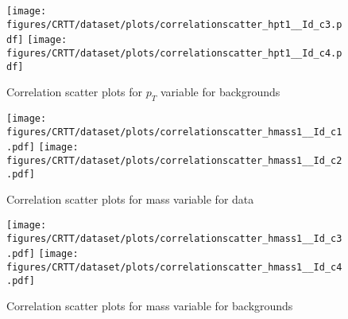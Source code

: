 \begin{figure}[!htb]%
\centering
\texttt{[image: figures/CRTT/dataset/plots/correlationscatter\_hpt1\_\_Id\_c3.pdf]}
\texttt{[image: figures/CRTT/dataset/plots/correlationscatter\_hpt1\_\_Id\_c4.pdf]}
\caption{ Correlation scatter plots for \HBB $p_{T}$ variable for backgrounds}%
\label{fig:correlations_CRTT_hpt1_BG}                                                       
\end{figure}\clearpage



\begin{figure}[!htb]%
\centering
\texttt{[image: figures/CRTT/dataset/plots/correlationscatter\_hmass1\_\_Id\_c1.pdf]}
\texttt{[image: figures/CRTT/dataset/plots/correlationscatter\_hmass1\_\_Id\_c2.pdf]}
\caption{ Correlation scatter plots for \HBB mass  variable for data}%
\label{fig:correlations_CRTT_hmass1_S}                                                       
\end{figure}\clearpage


\begin{figure}[!htb]%
\centering
\texttt{[image: figures/CRTT/dataset/plots/correlationscatter\_hmass1\_\_Id\_c3.pdf]}
\texttt{[image: figures/CRTT/dataset/plots/correlationscatter\_hmass1\_\_Id\_c4.pdf]}
\caption{ Correlation scatter plots for \HBB mass variable for backgrounds}%
\label{fig:correlations_CRTT_hmass1_BG}                                                       
\end{figure}\clearpage
 
